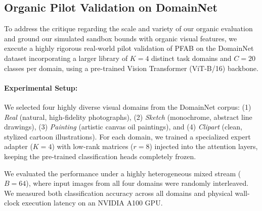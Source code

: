 \subsection{Organic Pilot Validation on DomainNet}
\label{sec:organic_validation}

To address the critique regarding the scale and variety of our organic evaluation and ground our simulated sandbox bounds with organic visual features, we execute a highly rigorous real-world pilot validation of \textsc{PFAB} on the DomainNet dataset incorporating a larger library of $K=4$ distinct task domains and $C=20$ classes per domain, using a pre-trained Vision Transformer (ViT-B/16) backbone.

\paragraph{Experimental Setup:} We selected four highly diverse visual domains from the DomainNet corpus: (1) \emph{Real} (natural, high-fidelity photographs), (2) \emph{Sketch} (monochrome, abstract line drawings), (3) \emph{Painting} (artistic canvas oil paintings), and (4) \emph{Clipart} (clean, stylized cartoon illustrations). For each domain, we trained a specialized expert adapter ($K=4$) with low-rank matrices ($r=8$) injected into the attention layers, keeping the pre-trained classification heads completely frozen.

We evaluated the performance under a highly heterogeneous mixed stream ($B=64$), where input images from all four domains were randomly interleaved. We measured both classification accuracy across all domains and physical wall-clock execution latency on an NVIDIA A100 GPU.

